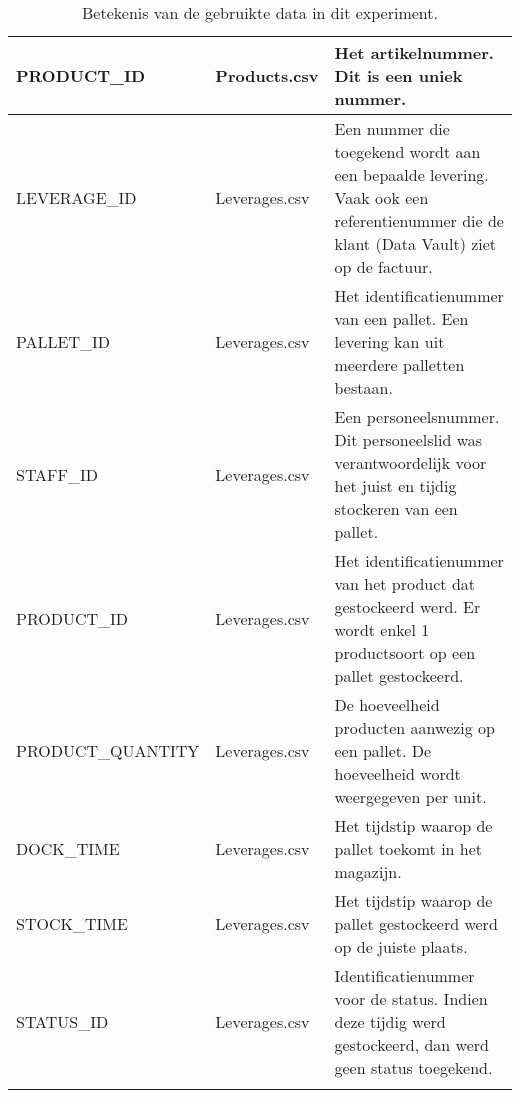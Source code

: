 \begin{center}
\begin{longtable}{  l  l  p{6cm} }
		PRODUCT\_ID & Products.csv & Het artikelnummer. Dit is een uniek nummer.  \\ \hline
		LEVERAGE\_ID & Leverages.csv & Een nummer die toegekend wordt aan een bepaalde levering.
		Vaak ook een referentienummer die de klant (Data Vault) ziet op de factuur. \\ \hline
		PALLET\_ID & Leverages.csv & Het identificatienummer van een pallet.
		Een levering kan uit meerdere palletten bestaan. \\ \hline
		STAFF\_ID & Leverages.csv & Een personeelsnummer. 
		Dit personeelslid was verantwoordelijk voor het juist en tijdig stockeren van een pallet. \\ \hline
		PRODUCT\_ID & Leverages.csv & Het identificatienummer van het product dat gestockeerd werd.
		Er wordt enkel 1 productsoort op een pallet gestockeerd. \\ \hline
		PRODUCT\_QUANTITY & Leverages.csv & De hoeveelheid producten aanwezig op een pallet.
		De hoeveelheid wordt weergegeven per unit. \\ \hline
		DOCK\_TIME & Leverages.csv & Het tijdstip waarop de pallet toekomt in het magazijn. \\ \hline
		STOCK\_TIME & Leverages.csv & Het tijdstip waarop de pallet gestockeerd werd op de juiste plaats. \\ \hline
		STATUS\_ID & Leverages.csv & Identificatienummer voor de status. Indien deze tijdig werd gestockeerd, dan werd geen status toegekend. \\
	\caption{Betekenis van de gebruikte data in dit experiment.}
	\label{tab:betekenisdata}
	\end{longtable}
\end{center}